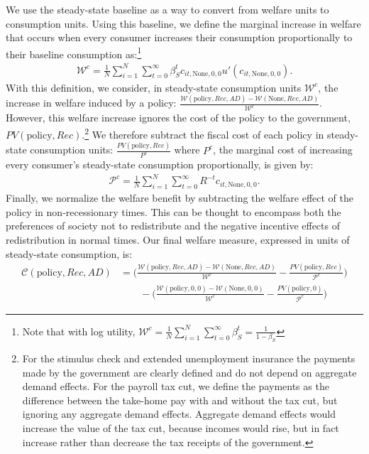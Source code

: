 \documentclass[../HAFiscal]{subfiles}
\begin{document}
We use the steady-state baseline as a way to convert from welfare units to consumption units. Using this baseline, we define the marginal increase in welfare that occurs when every consumer increases their consumption proportionally to their baseline consumption as:\footnote{Note that with log utility, $\mathcal{W}^c =\frac{1}{N}\sum_{i=1}^{N} \sum_{t=0}^{\infty} \beta_S^t = \frac{1}{1-\beta_S}$}
\begin{align}
	\mathcal{W}^c =\frac{1}{N}\sum_{i=1}^{N} \sum_{t=0}^{\infty} \beta_S^t c_{it,\text{None},0,0} u'(c_{it,\text{None},0,0}) .
\end{align}
With this definition, we consider, in steady-state consumption units $\mathcal{W}^c$, the increase in welfare induced by a policy: $\frac{\mathcal{W}(\text{policy},Rec,AD)-\mathcal{W}(\text{None},Rec,AD)}{\mathcal{W}^c}$. However, this welfare increase ignores the cost of the policy to the government, $PV(\text{policy},Rec)$.\footnote{For the stimulus check and extended unemployment insurance the payments made by the government are clearly defined and do not depend on aggregate demand effects. For the payroll tax cut, we define the payments as the difference between the take-home pay with and without the tax cut, but ignoring any aggregate demand effects. Aggregate demand effects would increase the value of the tax cut, because incomes would rise, but in fact increase rather than decrease the tax receipts of the government.} We therefore subtract the fiscal cost of each policy in steady-state consumption units:  $\frac{PV(\text{policy},Rec)}{{P}^c}$ where ${P}^c$, the marginal cost of increasing every consumer's steady-state consumption proportionally, is given by:
\begin{align}
	\mathcal{P}^c = \frac{1}{N}\sum_{i=1}^{N} \sum_{t=0}^{\infty} R^{-t} c_{it,\text{None},0,0} .
\end{align}
Finally, we normalize the welfare benefit by subtracting the welfare effect of the policy in non-recessionary times. This can be thought to encompass both the preferences of society not to redistribute and the negative incentive effects of redistribution in normal times. Our final welfare measure, expressed in units of steady-state consumption, is:
\begin{align}
	\mathcal{C}(\text{policy},Rec,AD) &= \bigg(\frac{\mathcal{W}(\text{policy},Rec,AD)-\mathcal{W}(\text{None},Rec,AD)}{\mathcal{W}^c} - \frac{PV(\text{policy},Rec)}{\mathcal{P}^c} \bigg) \nonumber \\  
	& \qquad -
	\bigg(\frac{\mathcal{W}(\text{policy},0,0) - \mathcal{W}(\text{None},0,0)}{\mathcal{W}^c} - \frac{PV(\text{policy},0)}{\mathcal{P}^c} \bigg) \label{welfare_defn}
\end{align}
\end{document}
